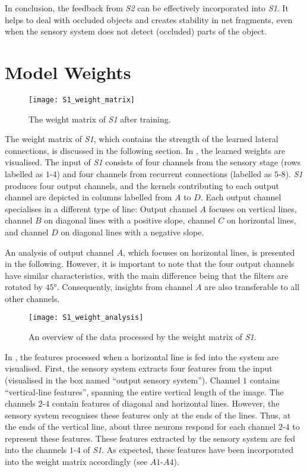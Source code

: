 In conclusion, the feedback from \emph{S2} can be effectively incorporated into \emph{S1}.
It helps to deal with occluded objects and creates stability in net fragments, even when the sensory system does not detect (occluded) parts of the object.



\section{Model Weights}
%
\begin{figure}[h]
    \centering
    \texttt{[image: S1\_weight\_matrix]}
    \caption[Weight matrix of \emph{S1} after training]{The weight matrix of \emph{S1} after training.}
\end{figure}
%
The weight matrix of \emph{S1}, which contains the strength of the learned lateral connections, is discussed in the following section.
In , the learned weights are visualised. 
The input of \emph{S1} consists of four channels from the sensory stage (rows labelled as $1$-$4$) and four channels from recurrent connections (labelled as $5$-$8$).
\emph{S1} produces four output channels, and the kernels contributing to each output channel are depicted in columns labelled from $A$ to $D$.
Each output channel specialises in a different type of line: Output channel $A$ focuses on vertical lines, channel $B$ on diagonal lines with a positive slope, channel $C$ on horizontal lines, and channel $D$ on diagonal lines with a negative slope.

An analysis of output channel $A$, which focuses on horizontal lines, is presented in the following.
However, it is important to note that the four output channels have similar characteristics, with the main difference being that the filters are rotated by $45°$. Consequently, insights from channel $A$ are also transferable to all other channels.

\begin{figure}[h]
    \centering
    \texttt{[image: S1\_weight\_analysis]}
    \caption[Analysis of the data processed by the weight matrix \emph{S1}]{An overview of the data processed by the weight matrix of \emph{S1}.}
\end{figure}
%
In , the features processed when a horizontal line is fed into the system are visualised.
First, the sensory system extracts four features from the input (visualised in the box named ``output sensory system'').
Channel $1$ contains ``vertical-line features'', spanning the entire vertical length of the image. 
The channels $2$-$4$ contain features of diagonal and horizontal lines. However, the sensory system recognises these features only at the ends of the lines.
Thus, at the ends of the vertical line, about three neurons respond for each channel $2$-$4$ to represent these features.
These features extracted by the sensory system are fed into the channels $1$-$4$ of \emph{S1}.
As expected, these features have been incorporated into the weight matrix accordingly (see $A1$-$A4$).

